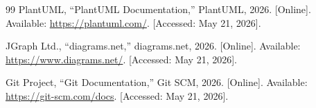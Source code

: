 \begin{thebibliography}{99}
PlantUML, ``PlantUML Documentation,'' PlantUML, 2026. [Online]. Available: \url{https://plantuml.com/}. [Accessed: May 21, 2026].

JGraph Ltd., ``diagrams.net,'' diagrams.net, 2026. [Online]. Available: \url{https://www.diagrams.net/}. [Accessed: May 21, 2026].

Git Project, ``Git Documentation,'' Git SCM, 2026. [Online]. Available: \url{https://git-scm.com/docs}. [Accessed: May 21, 2026].

\end{thebibliography}
\renewcommand{\bibname}{Bibliography}
\endgroup
